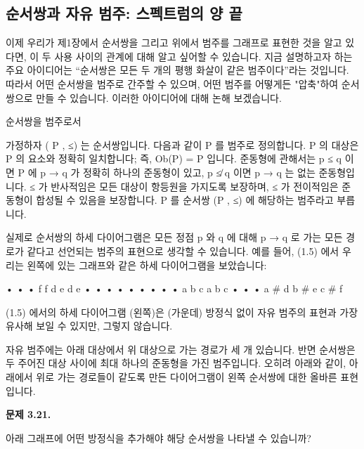 \documentclass[11pt, a4paper, twoside, openany]{book}
\begin{document}
{\subsection{순서쌍과 자유 범주: 스펙트럼의 양 끝}
\label{sec:3-2-3}

이제 우리가 제\hspace{0pt}1\hspace{0pt}장에서 순서쌍을 그리고 위에서 범주를 그래프로 표현한 것을 알고 있다면, 이 두 사용 사이의 관계에 대해 알고 싶어할 수 있습니다. 지금 설명하고자 하는 주요 아이디어는 “순서쌍은 모든 두 개의 평행 화살이 같은 범주이다”라는 것입니다. 따라서 어떤 순서쌍을 범주로 간주할 수 있으며, 어떤 범주를 어떻게든 "압축"하여 순서쌍으로 만들 수 있습니다. 이러한 아이디어에 대해 논해 보겠습니다.

\par\medskip
순서쌍을 범주로서

\par\medskip
가정하자 ( P , ≤) 는 순서쌍입니다. 다음과 같이 P 를 범주로 정의합니다. P 의 대상은 P 의 요소와 정확히 일치합니다; 즉, Ob(P) = P 입니다. 준동형에 관해서는 p ≤ q 이면 P 에 p → q 가 정확히 하나의 준동형이 있고, p ≰ q 이면 p → q 는 없는 준동형입니다. ≤ 가 반사적임은 모든 대상이 항등원을 가지도록 보장하며, ≤ 가 전이적임은 준동형이 합성될 수 있음을 보장합니다. P 를 순서쌍 (P , ≤) 에 해당하는 범주라고 부릅니다.

\par\medskip
실제로 순서쌍의 하세 다이어그램은 모든 정점 p 와 q 에 대해 p → q 로 가는 모든 경로가 같다고 선언되는 범주의 표현으로 생각할 수 있습니다. 예를 들어, (1.5) 에서 우리는 왼쪽에 있는 그래프와 같은 하세 다이어그램을 보았습니다:

\par\medskip
•
•
•
f
f
d
e
d
e
•
•
•
•
•
•
•
•
•
a
b
c
a
b
c
•
•
•
a \# d  b \# e  c \# f

\par\medskip
(1.5) 에서의 하세 다이어그램 (왼쪽)은 (가운데) 방정식 없이 자유 범주의 표현과 가장 유사해 보일 수 있지만, 그렇지 않습니다.

\par\medskip
자유 범주에는 아래 대상에서 위 대상으로 가는 경로가 세 개 있습니다. 반면 순서쌍은 두 주어진 대상 사이에 최대 하나의 준동형을 가진 범주입니다. 오히려 아래와 같이, 아래에서 위로 가는 경로들이 같도록 만든 다이어그램이 왼쪽 순서쌍에 대한 올바른 표현입니다.

\par\medskip
\textbf{문제 3.21.}

\par\medskip
아래 그래프에 어떤 방정식을 추가해야 해당 순서쌍을 나타낼 수 있습니까?

}
\end{document}
